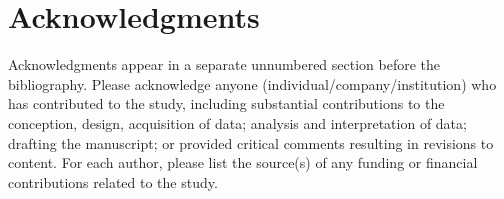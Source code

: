 \documentclass{josis}
\begin{document}
\section*{Acknowledgments}

Acknowledgments appear in a separate unnumbered section before the bibliography. Please acknowledge anyone (individual/company/institution) who has contributed to the study, including substantial contributions to the conception, design, acquisition of data; analysis and interpretation of data; drafting the manuscript; or provided critical comments resulting in revisions to content. For each author, please list the source(s) of any funding or financial contributions related to the study.



\end{document}
